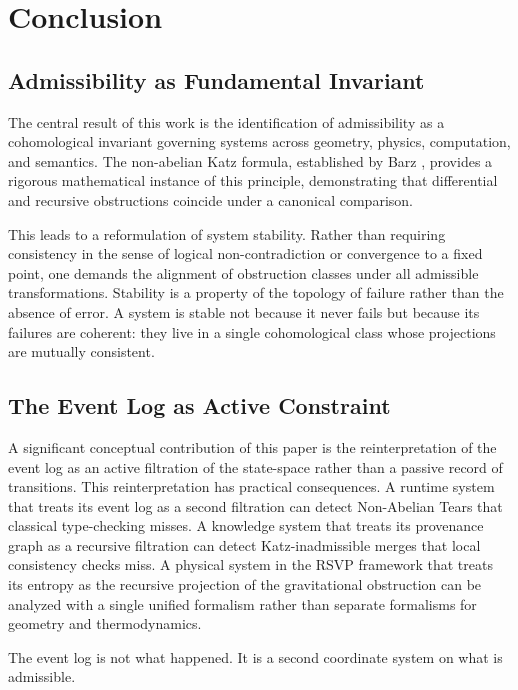 \documentclass[12pt]{article}
\begin{document}
\section{Conclusion}

\subsection{Admissibility as Fundamental Invariant}

The central result of this work is the identification of admissibility as a
cohomological invariant governing systems across geometry, physics, computation, and
semantics. The non-abelian Katz formula, established by Barz \cite{barz}, provides a
rigorous mathematical instance of this principle, demonstrating that differential and
recursive obstructions coincide under a canonical comparison.

This leads to a reformulation of system stability. Rather than requiring consistency in
the sense of logical non-contradiction or convergence to a fixed point, one demands the
alignment of obstruction classes under all admissible transformations. Stability is a
property of the topology of failure rather than the absence of error. A system is
stable not because it never fails but because its failures are coherent: they live in
a single cohomological class whose projections are mutually consistent.

\subsection{The Event Log as Active Constraint}

A significant conceptual contribution of this paper is the reinterpretation of the
event log as an active filtration of the state-space rather than a passive record of
transitions. This reinterpretation has practical consequences. A runtime system that
treats its event log as a second filtration can detect Non-Abelian Tears that classical
type-checking misses. A knowledge system that treats its provenance graph as a
recursive filtration can detect Katz-inadmissible merges that local consistency checks
miss. A physical system in the RSVP framework that treats its entropy as the recursive
projection of the gravitational obstruction can be analyzed with a single unified
formalism rather than separate formalisms for geometry and thermodynamics.

The event log is not what happened. It is a second coordinate system on what is
admissible.
\end{document}
